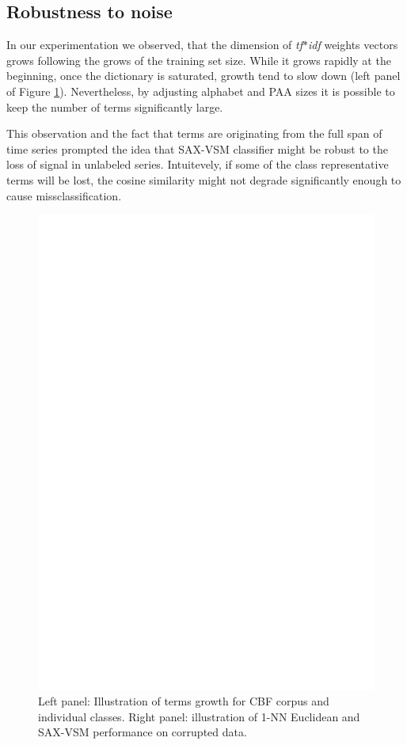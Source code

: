 \documentclass{llncs}
\begin{document}
\subsection{Robustness to noise}
In our experimentation we observed, that the dimension of \textit{tf$\ast$idf} weights vectors 
grows following the grows of the training set size. While it grows rapidly at the beginning, once
the dictionary is saturated, growth tend to slow down (left panel of Figure \ref{fig:corrupted}). 
Nevertheless, by adjusting alphabet and PAA sizes it is possible to keep the number of terms
significantly large. 

This observation and the fact that terms are originating from the full span of time series prompted
the idea that SAX-VSM classifier might be robust to the loss of signal in unlabeled
series. Intuitevely, if some of the class representative terms will be lost, the cosine
similarity might not degrade significantly enough to cause missclassification.

\begin{figure}[t]
   \centering
   \includegraphics[width=115mm]{figures/corrupted.ps}
   \caption{Left panel: Illustration of terms growth for CBF corpus and individual classes.
Right panel: illustration of 1-NN Euclidean and SAX-VSM performance on corrupted data.}
   \label{fig:corrupted}
\end{figure}
\end{document}
